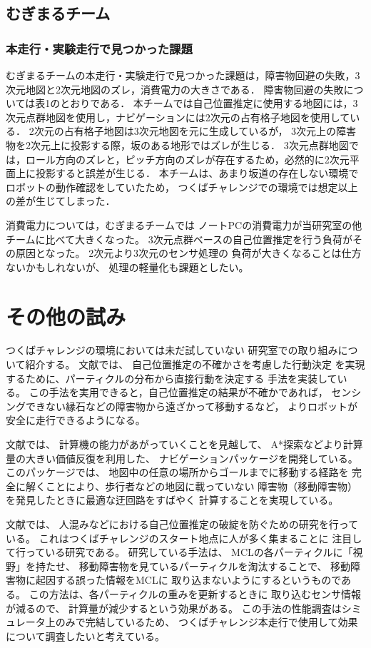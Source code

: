 \documentclass[twocolumn,9pt]{jsproceedings}
\begin{document}
\subsection{むぎまるチーム}
\subsubsection{本走行・実験走行で見つかった課題}

むぎまるチームの本走行・実験走行で見つかった課題は，障害物回避の失敗，3次元地図と2次元地図のズレ，消費電力の大きさである．
障害物回避の失敗については表1のとおりである．
本チームでは自己位置推定に使用する地図には，3次元点群地図を使用し，ナビゲーションには2次元の占有格子地図を使用している．
2次元の占有格子地図は3次元地図を元に生成しているが，
3次元上の障害物を2次元上に投影する際，坂のある地形ではズレが生じる．
3次元点群地図では，ロール方向のズレと，ピッチ方向のズレが存在するため，必然的に2次元平面上に投影すると誤差が生じる．
本チームは、あまり坂道の存在しない環境でロボットの動作確認をしていたため，
つくばチャレンジでの環境では想定以上の差が生じてしまった．

消費電力については，むぎまるチームでは
ノートPCの消費電力が当研究室の他チームに比べて大きくなった。
3次元点群ベースの自己位置推定を行う負荷がその原因となった。
2次元より3次元のセンサ処理の
負荷が大きくなることは仕方ないかもしれないが、
処理の軽量化も課題としたい。

\section{その他の試み}

つくばチャレンジの環境においては未だ試していない
研究室での取り組みについて紹介する。
文献\cite{上田2023}では、
自己位置推定の不確かさを考慮した行動決定
を実現するために、パーティクルの分布から直接行動を決定する
手法を実装している。
この手法を実用できると，自己位置推定の結果が不確かであれば，
センシングできない縁石などの障害物から遠ざかって移動するなど，
よりロボットが安全に走行できるようになる。

文献\cite{tonouchi2023}\cite{ueda2023JRM}では、
計算機の能力があがっていくことを見越して、
A*探索などより計算量の大きい価値反復を利用した、
ナビゲーションパッケージを開発している。
このパッケージでは、
地図中の任意の場所からゴールまでに移動する経路を
完全に解くことにより、歩行者などの地図に載っていない
障害物（移動障害物）を発見したときに最適な迂回路をすばやく
計算することを実現している。



文献\cite{ikebeMECH}では、
人混みなどにおける自己位置推定の破綻を防ぐための研究を行っている。
これはつくばチャレンジのスタート地点に人が多く集まることに
注目して行っている研究である。
研究している手法は、
MCLの各パーティクルに「視野」を持たせ、
移動障害物を見ているパーティクルを淘汰することで、
移動障害物に起因する誤った情報をMCLに
取り込まないようにするというものである。
この方法は、各パーティクルの重みを更新するときに
取り込むセンサ情報が減るので、
計算量が減少するという効果がある。
この手法の性能調査はシミュレータ上のみで完結しているため、
つくばチャレンジ本走行で使用して効果について調査したいと考えている。
\end{document}
